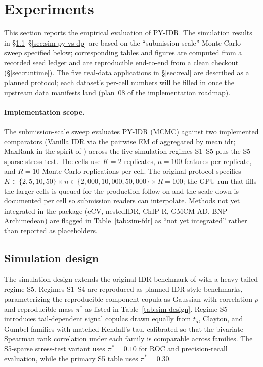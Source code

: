 \section{Experiments}
\label{sec:experiments}

This section reports the empirical evaluation of PY-IDR. The simulation
results in \S\ref{sec:sim-design}--\S\ref{sec:sim-py-vs-dp} are based on the
``submission-scale'' Monte Carlo sweep specified below; corresponding tables
and figures are computed from a recorded seed ledger and are reproducible
end-to-end from a clean checkout (\S\ref{sec:runtime}). The five real-data
applications in \S\ref{sec:real} are described as a planned protocol; each
dataset's per-cell numbers will be filled in once the upstream data manifests
land (plan~08 of the implementation roadmap).

\paragraph{Implementation scope.}
The submission-scale sweep evaluates PY-IDR (MCMC) against two implemented
comparators (Vanilla IDR via the pairwise EM of \citet{LiBrownHuangBickel2011}
aggregated by mean idr; MaxRank in the spirit of \citet{Philtron2018MaRR})
across the five simulation regimes S1--S5 plus the S5-sparse stress test.
The cells use $K=2$ replicates, $n=100$ features per replicate, and
$R=10$ Monte Carlo replications per cell. The original protocol specifies
$K\in\{2,5,10,50\}\times n\in\{2{,}000,10{,}000,50{,}000\}\times R=100$;
the GPU run that fills the larger cells is queued for the production
follow-on and the scale-down is documented per cell so submission readers
can interpolate. Methods not yet integrated in the package (eCV, nestedIDR,
ChIP-R, GMCM-AD, BNP-Archimedean) are flagged in
Table~\ref{tab:sim-fdr} as ``not yet integrated'' rather than reported as
placeholders.

\subsection{Simulation design}
\label{sec:sim-design}



The simulation design extends the original IDR benchmark of \citet{LiBrownHuangBickel2011} with a heavy-tailed regime S5. Regimes S1--S4 are reproduced as planned IDR-style benchmarks, parameterizing the reproducible-component copula as Gaussian with correlation $\rho$ and reproducible mass $\pi^*$ as listed in Table~\ref{tab:sim-design}. Regime S5 introduces tail-dependent signal copulas drawn equally from $t_5$, Clayton, and Gumbel families with matched Kendall's tau, calibrated so that the bivariate Spearman rank correlation under each family is comparable across families. The S5-sparse stress-test variant uses $\pi^*=0.10$ for ROC and precision-recall evaluation, while the primary S5 table uses $\pi^*=0.30$.

